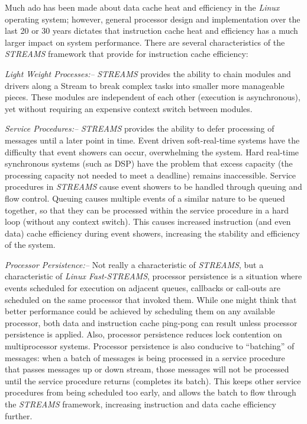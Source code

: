 \documentclass[letterpaper,final,notitlepage,twocolumn,10pt,twoside]{article}
\begin{document}
Much ado has been made about data cache heat and efficiency in the {\sl Linux}
operating system; however, general processor design and implementation over the
last 20 or 30 years dictates that instruction cache heat and efficiency has a
much larger impact on system performance.  There are several characteristics of
the {\sl STREAMS} framework that provide for instruction cache efficiency:

\begin{description}

\item{\it Light Weight Processes:--} {\sl STREAMS} provides the ability to chain
modules and drivers along a Stream to break complex tasks into smaller more
manageable pieces.  These modules are independent of each other (execution is
asynchronous), yet without requiring an expensive context switch between
modules.

\item{\it Service Procedures:--} {\sl STREAMS} provides the ability to defer
processing of messages until a later point in time.  Event driven soft-real-time
systems have the difficulty that event showers can occur, overwhelming the
system.  Hard real-time synchronous systems (such as DSP) have the problem that
excess capacity (the processing capacity not needed to meet a deadline) remains
inaccessible.  Service procedures in {\sl STREAMS} cause event showers to be
handled through queuing and flow control.  Queuing causes multiple events of a
similar nature to be queued together, so that they can be processed within the
service procedure in a hard loop (without any context switch).  This causes
increased instruction (and even data) cache efficiency during event showers,
increasing the stability and efficiency of the system.

\item{\it Processor Persistence:--} Not really a characteristic of {\sl
STREAMS}, but a characteristic of {\sl Linux Fast-STREAMS}, processor
persistence is a situation where events scheduled for execution on adjacent
queues, callbacks or call-outs are scheduled on the same processor that invoked
them.  While one might think that better performance could be achieved by
scheduling them on any available processor, both data and instruction cache
ping-pong can result unless processor persistence is applied.  Also, processor
persistence reduces lock contention on multiprocessor systems.  Processor
persistence is also conducive to ``batching'' of messages: when a batch of
messages is being processed in a service procedure that passes messages up or
down stream, those messages will not be processed until the service procedure
returns (completes its batch).  This keeps other service procedures from being
scheduled too early, and allows the batch to flow through the {\sl STREAMS}
framework, increasing instruction and data cache efficiency further.

\end{description}
\end{document}
